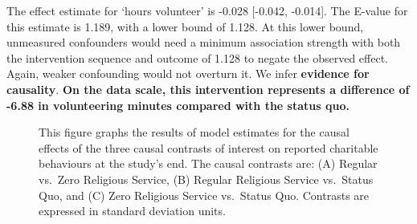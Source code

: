 \documentclass[
  single column]{article}
\begin{document}
The effect estimate for `hours volunteer' is -0.028 {[}-0.042,
-0.014{]}. The E-value for this estimate is 1.189, with a lower bound of
1.128. At this lower bound, unmeasured confounders would need a minimum
association strength with both the intervention sequence and outcome of
1.128 to negate the observed effect. Again, weaker confounding would not
overturn it. We infer \textbf{evidence for causality}. \textbf{On the
data scale, this intervention represents a difference of -6.88 in
volunteering minutes compared with the status quo.}

\begin{figure}


\caption{\label{fig-1_1}This figure graphs the results of model
estimates for the causal effects of the three causal contrasts of
interest on reported charitable behaviours at the study's end. The
causal contrasts are: (A) Regular vs.~Zero Religious Service, (B)
Regular Religious Service vs.~Status Quo, and (C) Zero Religious Service
vs.~Status Quo. Contrasts are expressed in standard deviation units.}

\end{figure}%
\end{document}

